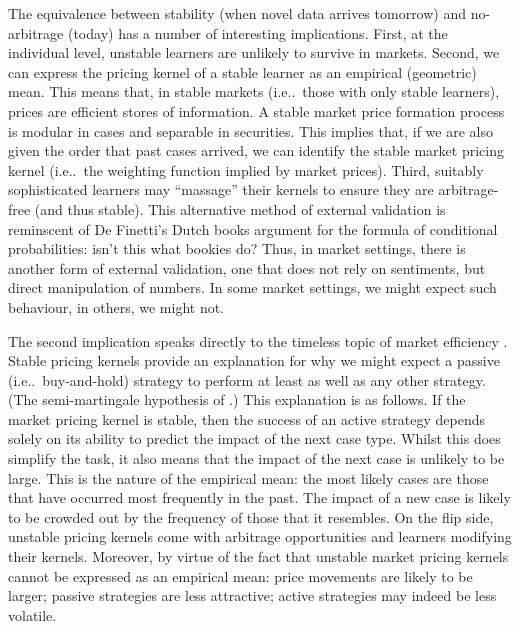 \documentclass[ecta,nameyear,draft]{econsocart}
\makeatletter
\newcommand\ie{i\@.e\@ifnextchar.{}{.\@}}
\theoremstyle{plain}
\theoremstyle{remark}
\makeatother
\begin{document}
The equivalence between stability (when novel data arrives tomorrow) and
no-arbitrage (today) has a number of interesting implications. First, at the
individual level, unstable learners are unlikely to survive in markets. Second,
we can express the pricing kernel of a stable learner as an empirical
(geometric) mean. This means that, in stable markets (\ie\ those with only
stable learners), prices are efficient stores of information. A stable market
price formation process is modular in cases and separable in securities. This
implies that, if we are also given the order that past cases arrived, we can
identify the stable market pricing kernel (\ie\ the weighting function implied
by market prices). Third, suitably sophisticated learners may ``massage'' their
kernels to ensure they are arbitrage-free (and thus stable). This alternative
method of external validation is reminscent of De Finetti's Dutch books
argument for the formula of conditional probabilities: isn't this what bookies
do? Thus, in market settings, there is another form of external validation, one
that does not rely on sentiments, but direct manipulation of numbers. In some
market settings, we might expect such behaviour, in others, we might not.

% 
 
The second implication speaks directly to the timeless topic of market
efficiency \citet{fama1970efficient,malkiel2003efficient}.  Stable pricing
kernels provide an explanation for why we might expect a passive (\ie\
buy-and-hold) strategy to perform at least as well as any other strategy.  (The
semi-martingale hypothesis of \citet{fama1970efficient}.) This explanation is
as follows. If the market pricing kernel is stable, then the success of an
active strategy depends solely on its ability to predict the impact of the next
case type.  Whilst this does simplify the task, it also means that the impact
of the next case is unlikely to be large. This is the nature of the empirical
mean: the most likely cases are those that have occurred most frequently in the
past. The impact of a new case is likely to be crowded out by the frequency of
those that it resembles.  On the flip side, unstable pricing kernels come with
arbitrage opportunities and learners modifying their kernels.  Moreover, by
virtue of the fact that unstable market pricing kernels cannot be expressed as
an empirical mean: price movements are likely to be larger; passive strategies
are less attractive; active strategies may indeed be less volatile.
\end{document}
